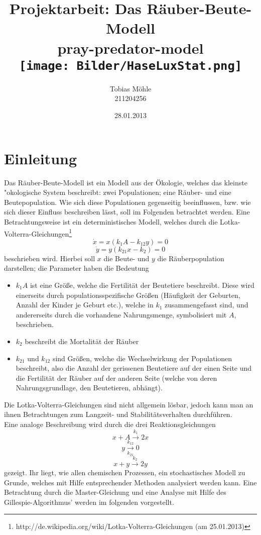 \documentclass[11pt]{article}
\begin{document}
\begin{titlepage}
\title{Projektarbeit: Das Räuber-Beute-Modell \\ \small{pray-predator-model}\\ \texttt{[image: Bilder/HaseLuxStat.png]}}
\author{Tobias Möhle \\ 211204256}
\date{28.01.2013}
\maketitle
\end{titlepage}

\section{Einleitung}
Das Räuber-Beute-Modell ist ein Modell aus der Ökologie, welches das kleinste "okologische System beschreibt: zwei Populationen; eine Räuber- und eine Beutepopulation. Wie sich diese Populationen gegenseitig beeinflussen, bzw. wie sich dieser Einfluss beschreiben lässt, soll im Folgenden betrachtet werden.
Eine Betrachtungsweise ist ein deterministisches Modell, welches durch die Lotka-Volterra-Gleichungen\footnote{http://de.wikipedia.org/wiki/Lotka-Volterra-Gleichungen (am 25.01.2013)}
$$\dot x=x(k_1 A-k_{12}y)=0$$
$$\dot y=y(k_{21}x-k_2)=0$$
beschrieben wird.
Hierbei soll $x$ die Beute- und $y$ die Räuberpopulation darstellen; die Parameter haben die Bedeutung
\begin{itemize}
   \item $k_1 A$ ist eine Größe, welche die Fertilität der Beutetiere beschreibt. Diese wird einerseits durch populationsspezifische Größen (Häufigkeit der Geburten, Anzahl der Kinder je Geburt etc.), welche in $k_1$ zusammengefasst sind, und andererseits durch die vorhandene Nahrungsmenge, symbolisiert mit $A$, beschrieben.
   \item $k_2$ beschreibt die Mortalität der Räuber
   \item $k_{21}$ und $k_{12}$ sind Größen, welche die Wechselwirkung der Populationen beschreibt, also die Anzahl der gerissenen Beutetiere auf der einen Seite und die Fertilität der Räuber auf der anderen Seite (welche von deren Nahrungsgrundlage, den Beutetieren, abhängt).
\end{itemize}

Die Lotka-Volterra-Gleichungen sind nicht allgemein lösbar, jedoch kann man an ihnen Betrachtungen zum Langzeit- und Stabilitätsverhalten durchführen.\\
Eine analoge Beschreibung wird durch die drei Reaktionsgleichungen 
$$x+A \xrightarrow{k_1} 2x $$
$$y \xrightarrow[k_{21}]{k_{12}} 0 $$
$$x+y \xrightarrow{k_2} 2y $$
gezeigt.
Ihr liegt, wie allen chemischen Prozessen, ein stochastisches Modell zu Grunde, welches mit Hilfe entsprechender Methoden analysiert werden kann. Eine Betrachtung durch die Master-Gleichung und eine Analyse mit Hilfe des Gillespie-Algorithmus' werden im folgenden vorgestellt.
\end{document}
